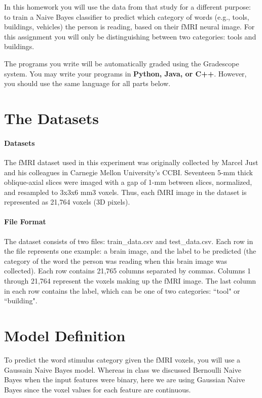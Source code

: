 \documentclass[11pt,addpoints,answers]{exam}
\begin{document}
In this homework you will use the data from that study for a different purpose: to train a Naive Bayes classifier to predict which category of words (e.g., tools, buildings, vehicles) the person is reading, based on their fMRI neural image. For this assignment you will only be distinguishing between two categories: tools and buildings. 


The programs you write will be automatically graded using the Gradescope system. You may write your programs in \textbf{Python, Java, or C++}. However, you should use the same language for all parts below.
\linebreak

\section{The Datasets}
\label{sec:dataset}

\paragraph{Datasets} 
The fMRI dataset used in this experiment was originally collected by Marcel Just and his colleagues in Carnegie Mellon University's CCBI. Seventeen 5-mm thick oblique-axial slices were imaged with a gap of 1-mm between slices, normalized, and resampled to 3x3x6 mm3 voxels. Thus, each fMRI image in the dataset is represented as 21,764 voxels (3D pixels).


\paragraph{File Format} The dataset consists of two files: train\_data.csv and test\_data.csv. Each row in the file represents one example: a brain image, and the label to be predicted (the category of the word the person was reading when this brain image was collected). Each row contains 21,765 columns separated by commas. Columns 1 through 21,764 represent the voxels making up the fMRI image. The last column in each row contains the label, which can be one of two categories: ``tool" or ``building". 

 \vspace{5mm}
\section{Model Definition}
\label{Model Definition}

To predict the word stimulus category given the fMRI voxels, you will use a Gaussain Naive Bayes model. Whereas in class we discussed Bernoulli Naive Bayes when the input features were binary, here we are using Gaussian Naive Bayes since the voxel values for each feature are continuous. \\
\end{document}
